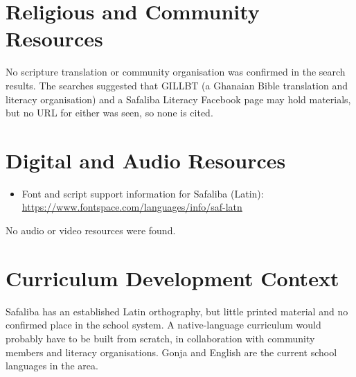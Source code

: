 \documentclass[12pt]{article}
\begin{document}
\section{Religious and Community Resources}
No scripture translation or community organisation was confirmed in the search results. The searches suggested that GILLBT (a Ghanaian Bible translation and literacy organisation) and a Safaliba Literacy Facebook page may hold materials, but no URL for either was seen, so none is cited.

\section{Digital and Audio Resources}
\begin{itemize}
\item Font and script support information for Safaliba (Latin): \url{https://www.fontspace.com/languages/info/saf-latn}
\end{itemize}
No audio or video resources were found.

\section{Curriculum Development Context}
Safaliba has an established Latin orthography, but little printed material and no confirmed place in the school system. A native-language curriculum would probably have to be built from scratch, in collaboration with community members and literacy organisations. Gonja and English are the current school languages in the area.
\end{document}
